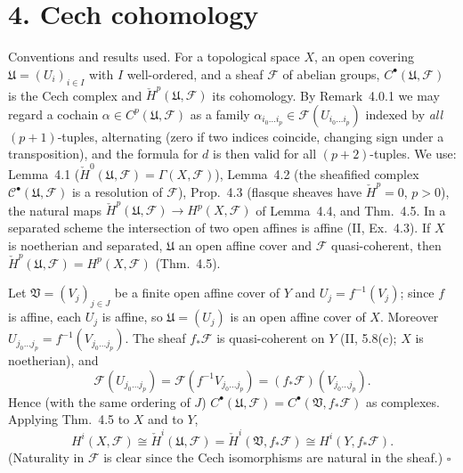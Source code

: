 \documentclass[11pt]{article}
\begin{document}
\section*{4. Cech cohomology}

Conventions and results used. For a topological space $X$, an open covering $\mathfrak U=(U_i)_{i\in I}$ with $I$ well-ordered, and a sheaf $\mathcal F$ of abelian groups, $C^\bullet(\mathfrak U,\mathcal F)$ is the Cech complex and $\check H^p(\mathfrak U,\mathcal F)$ its cohomology. By Remark~4.0.1 we may regard a cochain $\alpha\in C^p(\mathfrak U,\mathcal F)$ as a family $\alpha_{i_0\dots i_p}\in\mathcal F(U_{i_0\dots i_p})$ indexed by \emph{all} $(p+1)$-tuples, alternating (zero if two indices coincide, changing sign under a transposition), and the formula for $d$ is then valid for all $(p+2)$-tuples. We use: Lemma~4.1 ($\check H^0(\mathfrak U,\mathcal F)=\Gamma(X,\mathcal F)$), Lemma~4.2 (the sheafified complex $\mathcal C^\bullet(\mathfrak U,\mathcal F)$ is a resolution of $\mathcal F$), Prop.~4.3 (flasque sheaves have $\check H^p=0$, $p>0$), the natural maps $\check H^p(\mathfrak U,\mathcal F)\to H^p(X,\mathcal F)$ of Lemma~4.4, and Thm.~4.5. In a separated scheme the intersection of two open affines is affine (II, Ex.~4.3). If $X$ is noetherian and separated, $\mathfrak U$ an open affine cover and $\mathcal F$ quasi-coherent, then $\check H^p(\mathfrak U,\mathcal F)=H^p(X,\mathcal F)$ (Thm.~4.5).

\pf
Let $\mathfrak V=(V_j)_{j\in J}$ be a finite open affine cover of $Y$ and $U_j=f^{-1}(V_j)$; since $f$ is affine, each $U_j$ is affine, so $\mathfrak U=(U_j)$ is an open affine cover of $X$. Moreover $U_{j_0\dots j_p}=f^{-1}(V_{j_0\dots j_p})$. The sheaf $f_*\mathcal F$ is quasi-coherent on $Y$ (II, 5.8(c); $X$ is noetherian), and
\[
\mathcal F(U_{j_0\dots j_p})=\mathcal F(f^{-1}V_{j_0\dots j_p})=(f_*\mathcal F)(V_{j_0\dots j_p}).
\]
Hence (with the same ordering of $J$) $C^\bullet(\mathfrak U,\mathcal F)=C^\bullet(\mathfrak V,f_*\mathcal F)$ as complexes. Applying Thm.~4.5 to $X$ and to $Y$,
\[
H^i(X,\mathcal F)\cong\check H^i(\mathfrak U,\mathcal F)=\check H^i(\mathfrak V,f_*\mathcal F)\cong H^i(Y,f_*\mathcal F).
\]
(Naturality in $\mathcal F$ is clear since the Cech isomorphisms are natural in the sheaf.) \hfill$\square$
\end{document}
